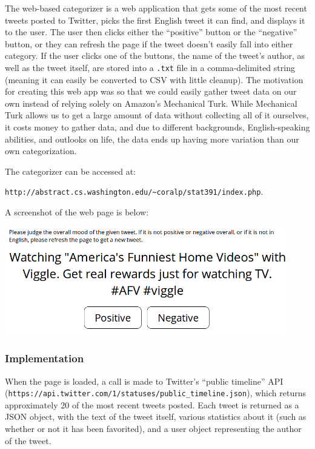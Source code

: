 \documentclass[12pt,a4paper]{article}
\begin{document}
The web-based categorizer is a web application that gets some of the most recent tweets posted to Twitter, picks the first English tweet it can find, and displays it to the user. The user then clicks either the ``positive'' button or the ``negative'' button, or they can refresh the page if the tweet doesn’t easily fall into either category. If the user clicks one of the buttons, the name of the tweet’s author, as well as the tweet itself, are stored into a \texttt{.txt} file in a comma-delimited string (meaning it can easily be converted to CSV with little cleanup). The motivation for creating this web app was so that we could easily gather tweet data on our own instead of relying solely on Amazon’s Mechanical Turk. While Mechanical Turk allows us to get a large amount of data without collecting all of it ourselves, it costs money to gather data, and due to different backgrounds, English-speaking abilities, and outlooks on life, the data ends up having more variation than our own categorization.

The categorizer can be accessed at:

\texttt{http://abstract.cs.washington.edu/\~{}coralp/stat391/index.php}.

A screenshot of the web page is below:

\includegraphics[width=470px]{figs/web_cat.png}

\subsubsection{Implementation}

When the page is loaded, a call is made to Twitter’s ``public timeline'' API \\
(\texttt{https://api.twitter.com/1/statuses/public\_timeline.json}), which returns approximately 20 of the most recent tweets posted. Each tweet is returned as a JSON object, with the text of the tweet itself, various statistics about it (such as whether or not it has been favorited), and a user object representing the author of the tweet.
\end{document}
